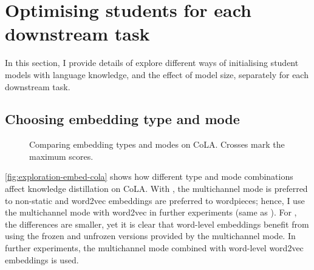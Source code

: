 \section{Optimising students for each downstream task}{
  In this section, I provide details of explore different ways of initialising student models with language knowledge, and the effect of model size, separately for each downstream task.

  \subsection{Choosing embedding type and mode}{
    \label{sec:A-exploration-embed}
    \begin{figure}[h!t]
      \centering
      \caption{Comparing embedding types and modes on CoLA. Crosses mark the maximum scores. \sliding}
      \label{fig:exploration-embed-cola}
    \end{figure}

    \autoref{fig:exploration-embed-cola} shows how different type and mode combinations affect knowledge distillation on CoLA. With \LSTMS, the multichannel mode is preferred to non-static and word2vec embeddings are preferred to wordpieces; hence, I use the multichannel mode with word2vec in further experiments (same as \citet{Tang_2019b}). For \BERTS, the differences are smaller, yet it is clear that word-level embeddings benefit from using the frozen and unfrozen versions provided by the multichannel mode. In further experiments, the multichannel mode combined with word-level word2vec embeddings is used.

}}

